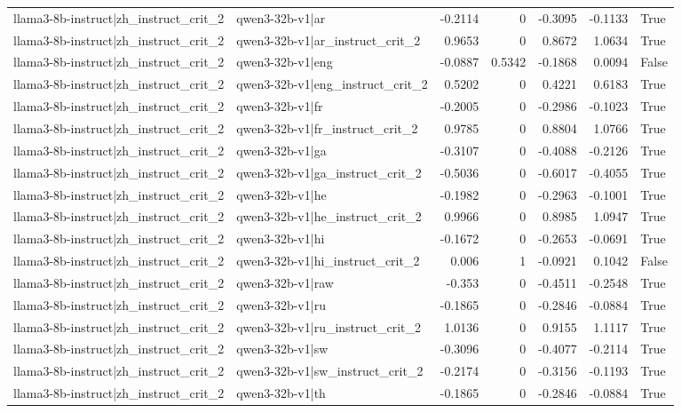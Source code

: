 \begin{table}
\begin{tabular}{l l r r r r l}
llama3-8b-instruct|zh_instruct_crit_2 & qwen3-32b-v1|ar & -0.2114 & 0 & -0.3095 & -0.1133 & True \\
llama3-8b-instruct|zh_instruct_crit_2 & qwen3-32b-v1|ar_instruct_crit_2 & 0.9653 & 0 & 0.8672 & 1.0634 & True \\
llama3-8b-instruct|zh_instruct_crit_2 & qwen3-32b-v1|eng & -0.0887 & 0.5342 & -0.1868 & 0.0094 & False \\
llama3-8b-instruct|zh_instruct_crit_2 & qwen3-32b-v1|eng_instruct_crit_2 & 0.5202 & 0 & 0.4221 & 0.6183 & True \\
llama3-8b-instruct|zh_instruct_crit_2 & qwen3-32b-v1|fr & -0.2005 & 0 & -0.2986 & -0.1023 & True \\
llama3-8b-instruct|zh_instruct_crit_2 & qwen3-32b-v1|fr_instruct_crit_2 & 0.9785 & 0 & 0.8804 & 1.0766 & True \\
llama3-8b-instruct|zh_instruct_crit_2 & qwen3-32b-v1|ga & -0.3107 & 0 & -0.4088 & -0.2126 & True \\
llama3-8b-instruct|zh_instruct_crit_2 & qwen3-32b-v1|ga_instruct_crit_2 & -0.5036 & 0 & -0.6017 & -0.4055 & True \\
llama3-8b-instruct|zh_instruct_crit_2 & qwen3-32b-v1|he & -0.1982 & 0 & -0.2963 & -0.1001 & True \\
llama3-8b-instruct|zh_instruct_crit_2 & qwen3-32b-v1|he_instruct_crit_2 & 0.9966 & 0 & 0.8985 & 1.0947 & True \\
llama3-8b-instruct|zh_instruct_crit_2 & qwen3-32b-v1|hi & -0.1672 & 0 & -0.2653 & -0.0691 & True \\
llama3-8b-instruct|zh_instruct_crit_2 & qwen3-32b-v1|hi_instruct_crit_2 & 0.006 & 1 & -0.0921 & 0.1042 & False \\
llama3-8b-instruct|zh_instruct_crit_2 & qwen3-32b-v1|raw & -0.353 & 0 & -0.4511 & -0.2548 & True \\
llama3-8b-instruct|zh_instruct_crit_2 & qwen3-32b-v1|ru & -0.1865 & 0 & -0.2846 & -0.0884 & True \\
llama3-8b-instruct|zh_instruct_crit_2 & qwen3-32b-v1|ru_instruct_crit_2 & 1.0136 & 0 & 0.9155 & 1.1117 & True \\
llama3-8b-instruct|zh_instruct_crit_2 & qwen3-32b-v1|sw & -0.3096 & 0 & -0.4077 & -0.2114 & True \\
llama3-8b-instruct|zh_instruct_crit_2 & qwen3-32b-v1|sw_instruct_crit_2 & -0.2174 & 0 & -0.3156 & -0.1193 & True \\
llama3-8b-instruct|zh_instruct_crit_2 & qwen3-32b-v1|th & -0.1865 & 0 & -0.2846 & -0.0884 & True \\

\end{tabular}
\end{table}
